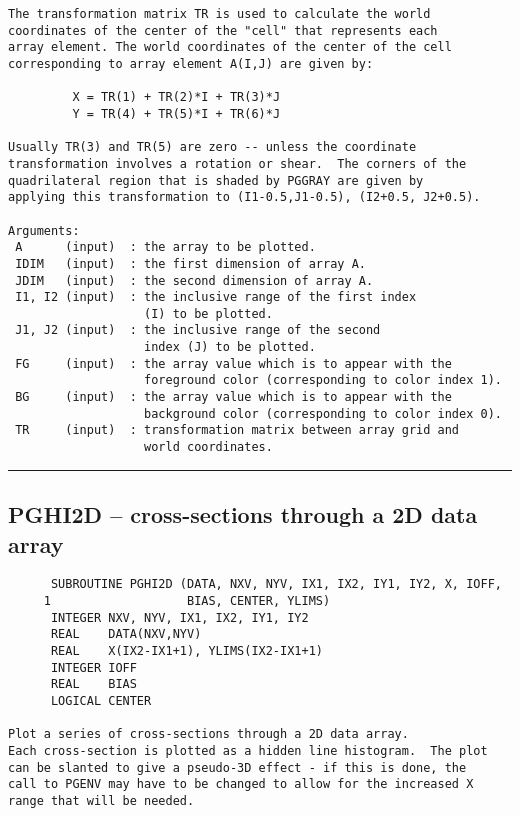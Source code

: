 {\begin{verbatim}
The transformation matrix TR is used to calculate the world
coordinates of the center of the "cell" that represents each
array element. The world coordinates of the center of the cell
corresponding to array element A(I,J) are given by:

         X = TR(1) + TR(2)*I + TR(3)*J
         Y = TR(4) + TR(5)*I + TR(6)*J

Usually TR(3) and TR(5) are zero -- unless the coordinate
transformation involves a rotation or shear.  The corners of the
quadrilateral region that is shaded by PGGRAY are given by
applying this transformation to (I1-0.5,J1-0.5), (I2+0.5, J2+0.5).

Arguments:
 A      (input)  : the array to be plotted.
 IDIM   (input)  : the first dimension of array A.
 JDIM   (input)  : the second dimension of array A.
 I1, I2 (input)  : the inclusive range of the first index
                   (I) to be plotted.
 J1, J2 (input)  : the inclusive range of the second
                   index (J) to be plotted.
 FG     (input)  : the array value which is to appear with the
                   foreground color (corresponding to color index 1).
 BG     (input)  : the array value which is to appear with the
                   background color (corresponding to color index 0).
 TR     (input)  : transformation matrix between array grid and
                   world coordinates.
\end{verbatim}
\hrule


\subsection*{PGHI2D -- cross-sections through a 2D data array }
\begin{verbatim}
      SUBROUTINE PGHI2D (DATA, NXV, NYV, IX1, IX2, IY1, IY2, X, IOFF,
     1                   BIAS, CENTER, YLIMS)
      INTEGER NXV, NYV, IX1, IX2, IY1, IY2
      REAL    DATA(NXV,NYV)
      REAL    X(IX2-IX1+1), YLIMS(IX2-IX1+1)
      INTEGER IOFF
      REAL    BIAS
      LOGICAL CENTER

Plot a series of cross-sections through a 2D data array.
Each cross-section is plotted as a hidden line histogram.  The plot
can be slanted to give a pseudo-3D effect - if this is done, the
call to PGENV may have to be changed to allow for the increased X
range that will be needed.


\end{verbatim}}
